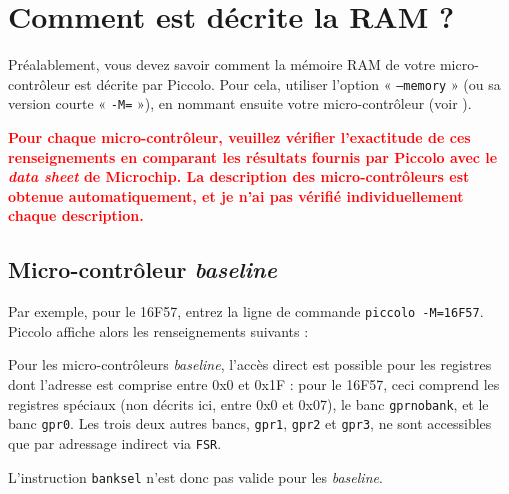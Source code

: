 
\cleardoublepage


\thispagestyle{empty}








\section{Comment est décrite la RAM ?}

Préalablement, vous devez savoir comment la mémoire RAM de votre micro-contrôleur est décrite par Piccolo. Pour cela, utiliser l'option « \texttt{--memory} » (ou sa version courte « \texttt{-M=} »), en nommant ensuite votre micro-contrôleur (voir ).

\textcolor{red}{\bf Pour chaque micro-contrôleur, veuillez vérifier l'exactitude de ces renseignements en comparant les résultats fournis par Piccolo avec le \emph{data sheet} de Microchip. La description des micro-contrôleurs est obtenue automatiquement, et je n'ai pas vérifié individuellement chaque description.}



\subsection{Micro-contrôleur \emph{baseline}}

Par exemple, pour le 16F57, entrez la ligne de commande \texttt{piccolo -M=16F57}. Piccolo affiche alors les renseignements suivants :



Pour les micro-contrôleurs \emph{baseline}, l'accès direct est possible pour les registres dont l'adresse est comprise entre 0x0 et 0x1F : pour le 16F57, ceci comprend les registres spéciaux (non décrits ici, entre 0x0 et 0x07), le banc \texttt{gprnobank}, et le banc \texttt{gpr0}. Les trois deux autres bancs, \texttt{gpr1}, \texttt{gpr2} et \texttt{gpr3}, ne sont accessibles que par adressage indirect via \texttt{FSR}.

L'instruction \texttt{banksel} n'est donc pas valide pour les \emph{baseline}.

